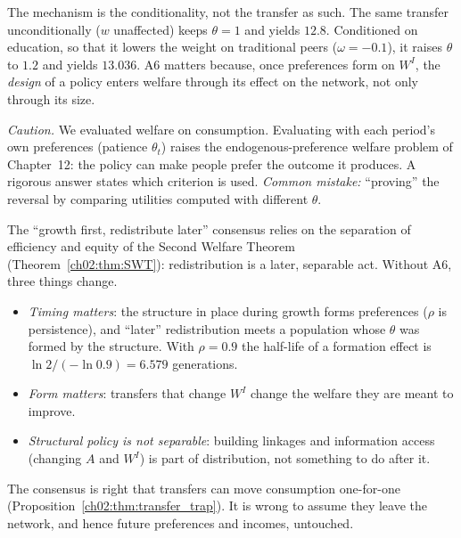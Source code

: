 \documentclass[../solutions_manual.tex]{subfiles}
\begin{document}
The mechanism is the conditionality, not the transfer as such. The same transfer unconditionally ($w$ unaffected) keeps $\theta = 1$ and yields $12.8$. Conditioned on education, so that it lowers the weight on traditional peers ($\omega = -0.1$), it raises $\theta$ to $1.2$ and yields $13.036$. A6 matters because, once preferences form on $W^I$, the \emph{design} of a policy enters welfare through its effect on the network, not only through its size.

\emph{Caution.} We evaluated welfare on consumption. Evaluating with each period's own preferences (patience $\theta_t$) raises the endogenous-preference welfare problem of Chapter~12: the policy can make people prefer the outcome it produces. A rigorous answer states which criterion is used. \emph{Common mistake:} ``proving'' the reversal by comparing utilities computed with different $\theta$.

 The ``growth first, redistribute later'' consensus relies on the separation of efficiency and equity of the Second Welfare Theorem (Theorem~\ref{ch02:thm:SWT}): redistribution is a later, separable act. Without A6, three things change.
\begin{itemize}
\item \emph{Timing matters}: the structure in place during growth forms preferences ($\rho$ is persistence), and ``later'' redistribution meets a population whose $\theta$ was formed by the structure. With $\rho = 0.9$ the half-life of a formation effect is $\ln2/(-\ln0.9) = 6.579$ generations.
\item \emph{Form matters}: transfers that change $W^I$ change the welfare they are meant to improve.
\item \emph{Structural policy is not separable}: building linkages and information access (changing $A$ and $W^I$) is part of distribution, not something to do after it.
\end{itemize}
The consensus is right that transfers can move consumption one-for-one (Proposition~\ref{ch02:thm:transfer_trap}). It is wrong to assume they leave the network, and hence future preferences and incomes, untouched.

\end{document}
